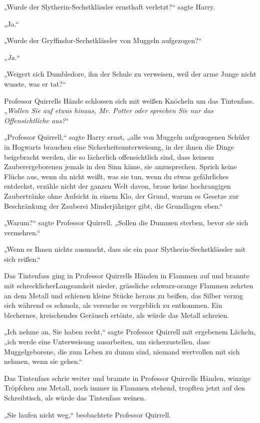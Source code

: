 {„Wurde der Slytherin-Sechstklässler ernsthaft verletzt?“ sagte Harry.

„Ja.“

„Wurde der Gryffindor-Sechstklässler von Muggeln aufgezogen?“

„\emph{Ja.}“

„Weigert sich Dumbledore, ihn der Schule zu verweisen, weil der arme Junge nicht wusste, was er tat?“

Professor Quirrells Hände schlossen sich mit weißen Knöcheln um das Tintenfass. „\emph{Wollen Sie auf etwas hinaus, Mr. Potter oder sprechen Sie nur das} \emph{Offensichtliche aus?}“

„Professor Quirrell,“ sagte Harry ernst, „alle von Muggeln aufgezogenen Schüler in Hogwarts brauchen eine Sicherheitsunterweisung, in der ihnen die Dinge beigebracht werden, die so lächerlich offensichtlich sind, dass keinem Zauberergeborenen jemals in den Sinn käme, sie anzusprechen. Sprich keine Flüche aus, wenn du nicht weißt, was sie tun, wenn du etwas gefährliches entdeckst, erzähle nicht der ganzen Welt davon, braue keine hochrangigen Zaubertränke ohne Aufsicht in einem Klo, der Grund, warum es Gesetze zur Beschränkung der Zauberei Minderjähriger gibt, die Grundlagen eben.“

„Warum?“ sagte Professor Quirrell. „Sollen die Dummen sterben, bevor sie sich vermehren.“

„Wenn es Ihnen nichts ausmacht, dass sie ein paar Slytherin-Sechstklässler mit sich reißen.“

Das Tintenfass ging in Professor Quirrells Händen in Flammen auf und brannte mit schrecklicherLangsamkeit nieder, grässliche schwarz-orange Flammen zehrten an dem Metall und schienen kleine Stücke heraus zu beißen, das Silber verzog sich während es schmolz, als versuche es vergeblich zu entkommen. Ein blechernes, kreischendes Geräusch ertönte, als würde das Metall schreien.

„Ich nehme an, Sie haben recht,“ sagte Professor Quirrell mit ergebenem Lächeln, „ich werde eine Unterweisung ausarbeiten, um sicherzustellen, dass Muggelgeborene, die zum Leben zu dumm sind, niemand wertvollen mit sich nehmen, wenn sie gehen.“

Das Tintenfass schrie weiter und brannte in Professor Quirrells Händen, winzige Tröpfchen aus Metall, noch immer in Flammen stehend, tropften jetzt auf den Schreibtisch, als würde das Tintenfass weinen.

„Sie laufen nicht weg,“ beobachtete Professor Quirrell.

}
